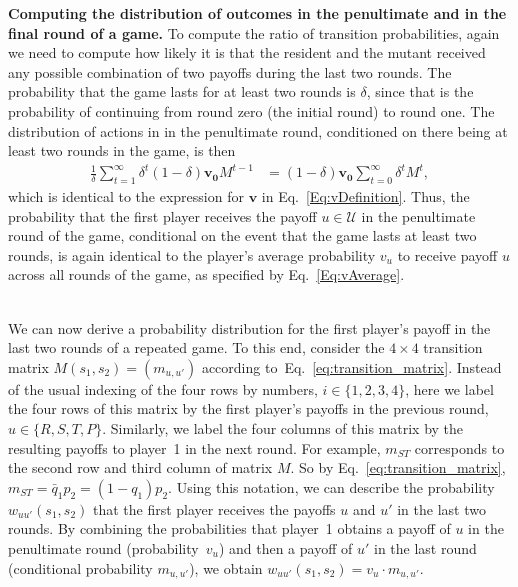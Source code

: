 \documentclass[11pt]{article}
\def\strategy{s}
\theoremstyle{plainCl1}
\theoremstyle{plainCl2}
\begin{document}

\noindent
{\bf Computing the distribution of outcomes in the penultimate and in the final round of a game.}
To compute the ratio of transition probabilities, again we need to compute how likely it is that the resident and the mutant received any possible combination of two payoffs during the last two rounds. 
The probability that the game lasts for at least two rounds is $\delta$, since that is the probability of continuing from round zero (the initial round) to round one. The distribution of actions in in the penultimate round, conditioned on there being at least two rounds in the game, is then
\begin{align}
	\frac{1}{\delta} \sum_{t=1}^{\infty} \delta^{t}\left(1-\delta\right) \mathbf{v_{0}} M^{t-1} &= \left(1-\delta\right)\mathbf{v_{0}}\sum_{t=0}^{\infty}\delta^{t}M^{t} ,
\end{align}
which is identical to the expression for $\mathbf{v}$ in Eq.~\eqref{Eq:vDefinition}.
Thus, the probability that the first player receives the payoff $u\!\in\!\mathcal{U}$ in the penultimate round of the game, conditional on the event that the game lasts at least two rounds, is again identical to the player's average probability $v_u$ to receive payoff $u$ across all rounds of the game, as specified by Eq.~\eqref{Eq:vAverage}.


~\\
\noindent
We can now derive a probability distribution for the first player's payoff in the last two rounds of a repeated game. 
To this end, consider the $4\times4$ transition matrix $M(\strategy_1,\strategy_2)\!=\!(m_{u,u'})$ according to~Eq.~\eqref{eq:transition_matrix}. 
Instead of the usual indexing of the four rows by numbers, $i\!\in\!\{1,2,3,4\}$, here we label the four rows of this matrix by the first player's payoffs in the previous round, $u\!\in\!\{R,S,T,P\}$. 
Similarly, we label the four columns of this matrix by the resulting payoffs to player~1 in the next round. 
For example, $m_{ST}$ corresponds to the second row and third column of matrix $M$. 
So by Eq.~\eqref{eq:transition_matrix}, $m_{ST} \!=\! \bar{q}_1 p_2 \!=\!(1\!-\!q_1)p_2$.
Using this notation, we can describe the probability $w_{uu'}(\strategy_1,\strategy_2)$ that the first player receives the payoffs $u$ and $u'$ in the last two rounds. 
By combining the probabilities that player~1 obtains a payoff of $u$ in the penultimate round (probability~$v_{u}$) and then a payoff of $u'$ in the last round (conditional probability $m_{u,u'}$), we obtain $w_{uu'}(\strategy_1,\strategy_2) = v_u \cdot m_{u,u'}$.
\end{document}

